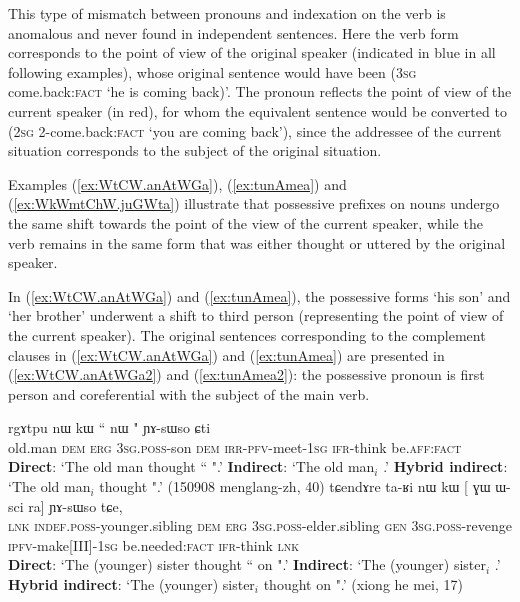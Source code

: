 This type of mismatch between pronouns and indexation on the verb is anomalous and never found in independent sentences. Here the verb form corresponds to the point of view of the original speaker (indicated in blue in all following examples), whose original sentence would have been  (\textsc{3sg} {come.back:\textsc{fact}} `he is coming back)'. The pronoun reflects the point of view of the current speaker (in red), for whom the equivalent sentence would be converted to  (\textsc{2sg} {2-come.back:\textsc{fact}} `you are coming back'), since the addressee of the current situation corresponds to the subject of the original situation.

Examples (\ref{ex:WtCW.anAtWGa}), (\ref{ex:tunAmea}) and (\ref{ex:WkWmtChW.juGWta}) illustrate that possessive prefixes on nouns undergo the same shift towards the point of the view of the current speaker, while the verb remains in the same form that was either thought or uttered by the original speaker.

In (\ref{ex:WtCW.anAtWGa}) and (\ref{ex:tunAmea}), the possessive forms  `his son' and `her brother'  underwent a shift to third person (representing the point of view of the current speaker). The original sentences corresponding to the complement clauses in (\ref{ex:WtCW.anAtWGa}) and (\ref{ex:tunAmea}) are presented in (\ref{ex:WtCW.anAtWGa2}) and (\ref{ex:tunAmea2}): the possessive pronoun is first person and coreferential with the subject of the main verb.
 
\begin{exe}
\ex 
\begin{xlist}
\ex \label{ex:WtCW.anAtWGa}
\gll rgɤtpu nɯ kɯ `` nɯ " ɲɤ-sɯso ɕti \\
old.man \textsc{dem} \textsc{erg} \textsc{3sg}.\textsc{poss}-son \textsc{dem} \textsc{irr}-\textsc{pfv}-meet-\textsc{1sg} \textsc{ifr}-think be.\textsc{aff}:\textsc{fact} \\
\glt  \textbf{Direct}: `The old man thought `` ".'
\glt  \textbf{Indirect}:  `The old man$_i$ .'
\glt  \textbf{Hybrid indirect}:  `The old man$_i$ thought  ".' (150908 menglang-zh, 40)
\ex \label{ex:tunAmea}
\gll tɕendɤre ta-ʁi nɯ kɯ [ ɣɯ ɯ-sci  ra] ɲɤ-sɯso tɕe, \\
\textsc{lnk}  \textsc{indef}.\textsc{poss}-younger.sibling \textsc{dem} \textsc{erg}  {\textsc{3sg}.\textsc{poss}-elder.sibling}  \textsc{gen} \textsc{3sg}.\textsc{poss}-revenge {\textsc{ipfv}-make[III]-\textsc{1sg}} be.needed:\textsc{fact} \textsc{ifr}-think \textsc{lnk} \\
\glt  \textbf{Direct}: `The (younger) sister thought `` on ".'
\glt  \textbf{Indirect}:  `The (younger) sister$_i$ .'
\glt  \textbf{Hybrid indirect}:  `The (younger) sister$_i$ thought  on ".' (xiong he mei, 17)
\end{xlist}
\end{exe} 

